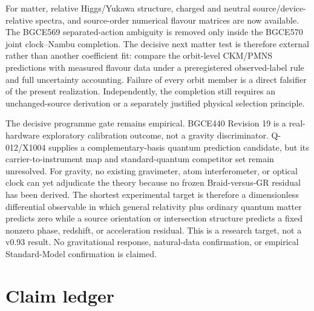 \documentclass[11pt]{article}
\theoremstyle{definition}
\theoremstyle{remark}
\begin{document}
For matter, relative Higgs/Yukawa structure, charged and neutral source/device-relative spectra, and source-order numerical flavour matrices are now available. The BGCE569 separated-action ambiguity is removed only inside the BGCE570 joint clock--Nambu completion. The decisive next matter test is therefore external rather than another coefficient fit: compare the orbit-level CKM/PMNS predictions with measured flavour data under a preregistered observed-label rule and full uncertainty accounting. Failure of every orbit member is a direct falsifier of the present realization. Independently, the completion still requires an unchanged-source derivation or a separately justified physical selection principle.

The decisive programme gate remains empirical. BGCE440 Revision 19 is a real-hardware exploratory calibration outcome, not a gravity discriminator. Q-012/X1004 supplies a complementary-basis quantum prediction candidate, but its carrier-to-instrument map and standard-quantum competitor set remain unresolved. For gravity, no existing gravimeter, atom interferometer, or optical clock can yet adjudicate the theory because no frozen Braid-versus-GR residual has been derived. The shortest experimental target is therefore a dimensionless differential observable in which general relativity plus ordinary quantum matter predicts zero while a source orientation or intersection structure predicts a fixed nonzero phase, redshift, or acceleration residual. This is a research target, not a v0.93 result. No gravitational response, natural-data confirmation, or empirical Standard-Model confirmation is claimed.

\section{Claim ledger}
\end{document}
